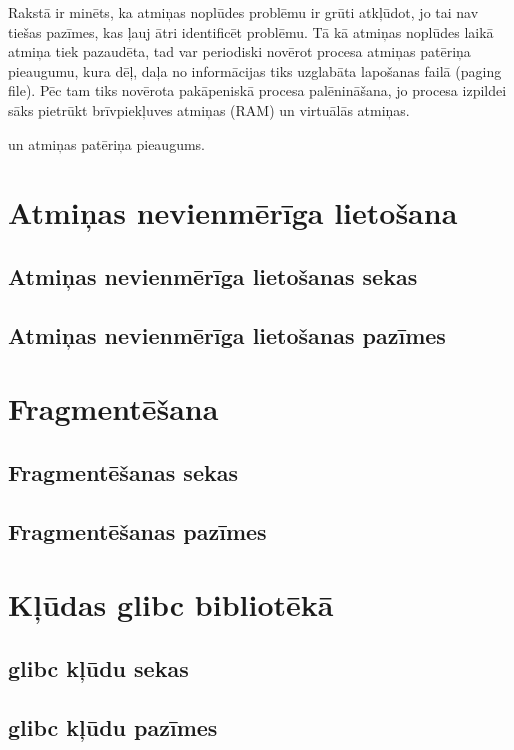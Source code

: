 Rakstā \cite{RHBJ} ir minēts, ka atmiņas noplūdes problēmu ir grūti atkļūdot, jo tai nav tiešas pazīmes, kas ļauj ātri identificēt problēmu.
Tā kā atmiņas noplūdes laikā atmiņa tiek pazaudēta, tad var periodiski novērot procesa atmiņas patēriņa pieaugumu, kura dēļ, daļa no informācijas tiks uzglabāta lapošanas failā (paging file).
Pēc tam tiks novērota pakāpeniskā procesa palēnināšana, jo procesa izpildei sāks pietrūkt brīvpiekļuves atmiņas (RAM) un virtuālās atmiņas.

 un atmiņas patēriņa pieaugums. 




\section{Atmiņas nevienmērīga lietošana}
\subsection{Atmiņas nevienmērīga lietošanas sekas}
\subsection{Atmiņas nevienmērīga lietošanas pazīmes}

\section{Fragmentēšana}
\subsection{Fragmentēšanas sekas}
\subsection{Fragmentēšanas pazīmes}

\section{Kļūdas glibc bibliotēkā}
\subsection{glibc kļūdu sekas}
\subsection{glibc kļūdu pazīmes}

